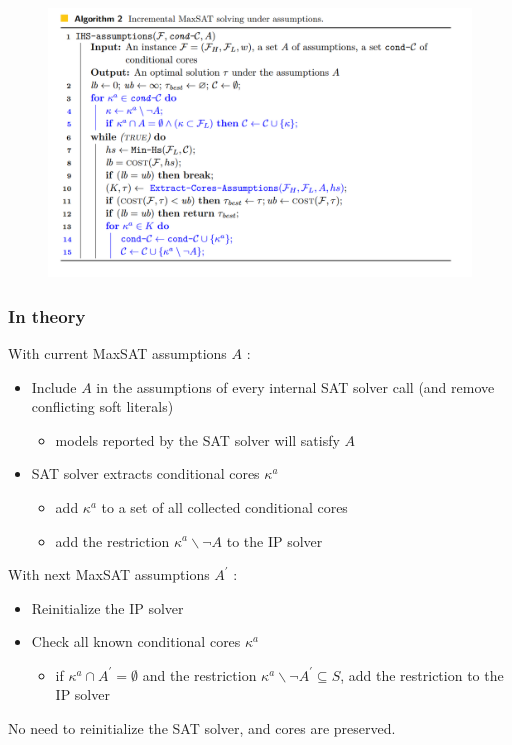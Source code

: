 \documentclass[aspectratio=169 %
,serif,mathserif]{beamer}
\begin{document}
\begin{frame}
	\begin{figure}[htbp]
		\includegraphics[width=0.73\linewidth]{8.png}
	\end{figure}
\end{frame}

\begin{frame}
	\frametitle{In theory}
With current MaxSAT assumptions $A$ :
	\begin{itemize}
		\item Include $A$ in the assumptions of every internal SAT solver call (and remove conflicting soft literals)
		\begin{itemize}
			\item models reported by the SAT solver will satisfy $A$
		\end{itemize} \pause
		\item SAT solver extracts conditional cores $\kappa^a$
		\begin{itemize}
			\item add $\kappa^a$ to a set of all collected conditional cores
			\item add the restriction $\kappa^a \backslash \neg A$ to the IP solver
		\end{itemize} \pause
	\end{itemize} \pause
	With next MaxSAT assumptions $A^{\prime}$ :
	\begin{itemize}
		\item Reinitialize the IP solver
		\item Check all known conditional cores $\kappa^a$
		\begin{itemize}
			\item if $\kappa^a \cap A^{\prime}=\emptyset$ and the restriction $\kappa^a \backslash \neg A^{\prime} \subseteq S$, add the restriction to the IP solver
		\end{itemize}
	\end{itemize} \pause
	No need to reinitialize the SAT solver, and cores are preserved.
\end{frame}
\end{document}
